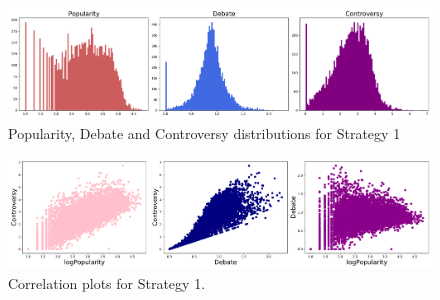 \begin{figure}[tb]
\centering
\includegraphics[width=\tw]{Pictures/Strat2Dist.pdf}
\caption{Popularity, Debate and Controversy distributions for Strategy 1}
\label{Str1Dist}
\end{figure}


\begin{figure}[tb]
\centering
\includegraphics[width=\tw]{Pictures/Strat2Corr.pdf}
\caption{Correlation plots for Strategy 1.}
\label{Str1Corr}
\end{figure}